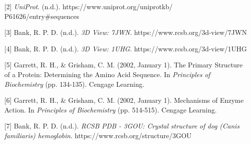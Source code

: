 \documentclass[%
 reprint,
 amsmath,amssymb,
 aps,
]{revtex4-2}
\begin{document}
[2] \textit{UniProt}. (n.d.). https://www.uniprot.org/uniprotkb/ P61626/entry\#sequences

[3] Bank, R. P. D. (n.d.). \textit{3D View: 7JWN}. https://www.rcsb.org/3d-view/7JWN

[4] Bank, R. P. D. (n.d.). \textit{3D View: 1UHG}. https://www.rcsb.org/3d-view/1UHG

[5] Garrett, R. H., \& Grisham, C. M. (2002, January 1). The Primary Structure of a Protein: Determining the Amino Acid Sequence. In \textit{Principles of Biochemistry} (pp. 134-135). Cengage Learning.

[6] Garrett, R. H., \& Grisham, C. M. (2002, January 1). Mechanisms of Enzyme Action. In \textit{Principles of Biochemistry} (pp. 514-515). Cengage Learning.

[7] Bank, R. P. D. (n.d.). \textit{RCSB PDB - 3GOU: Crystal structure of dog (Canis familiaris) hemoglobin}. https://www.rcsb.org/structure/3GOU
\end{document}
